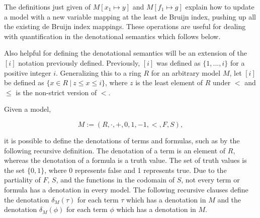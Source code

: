\documentclass[11pt]{article}
\begin{document}
The definitions just given of $M[x_1 \mapsto y]$ and $M[f_1 \mapsto g]$
explain how to update a model with a new variable mapping at
the least de Bruijn index, pushing up all the existing de
Bruijn index mappings. These operations are useful for dealing
with quantification in the denotational semantics which follows below.

Also helpful for defining the denotational semantics
will be an extension of the $[i]$ notation previously
defined. Previously, $[i]$ was defined as $\{1, ..., i\}$
for a positive integer $i$. Generalizing this to a ring $R$ for an arbitrary model
$M$, let $[i]$ be defined as $\{x \in R\ |\ z \leq x \leq i\}$, where
$z$ is the least element of $R$ under $<$ and $\leq$ is the
non-strict version of $<$.

Given a model,

\begin{equation}
	M := (R, \cdot, +, 0, 1, -1, <, F, S),
\end{equation}

it is possible to define the denotations of terms and formulas, such as
by the following recursive definition. The denotation of a term is an
element of $R$, whereas the denotation of a formula is a truth value.
The set of truth values is the set $\{0, 1\}$, where 0 represents false
and 1 represents true. Due to the partiality of $F$, $S$, and the
functions in the codomain of $S$, not every term or formula has a
denotation in every model. The following recursive clauses define the
denotation $\delta_M(\tau)$ for each term $\tau$ which has a denotation
in $M$ and the denotation $\delta_M(\phi)$ for each term $\phi$ which
has a denotation in $M$.
\end{document}
